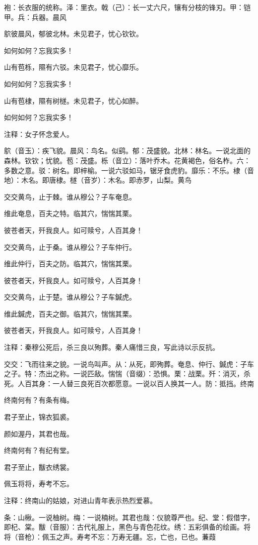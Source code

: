 \documentclass[12pt,UTF8]{ctexbook}
\begin{document}
袍：长衣服的统称。泽：里衣。戟（己）：长一丈六尺，镶有分枝的锋刃。甲：铠甲。兵：兵器。晨风

鴥彼晨风，郁彼北林。未见君子，忧心钦钦。

如何如何？忘我实多！

山有苞栎，隰有六驳。未见君子，忧心靡乐。

如何如何？忘我实多！

山有苞棣，隰有树檖。未见君子，忧心如醉。

如何如何？忘我实多！

注释：女子怀念爱人。

鴥（音玉）：疾飞貌。晨风：鸟名。似鹞。郁：茂盛貌。北林：林名。一说北面的森林。钦钦；忧貌。苞：茂盛。栎（音立）：落叶乔木。花黄褐色，俗名柞。六：多数之意。驳：树名。即梓榆。一说六驳如马，锯牙食虎豹。靡乐：不乐。棣（音地）：木名。即唐棣。檖（音岁）：木名。即赤罗，山梨。黄鸟

交交黄鸟，止于棘。谁从穆公？子车奄息。

维此奄息，百夫之特。临其穴，惴惴其栗。

彼苍者天，歼我良人。如可赎兮，人百其身！

交交黄鸟，止于桑。谁从穆公？子车仲行。

维此仲行，百夫之防。临其穴，惴惴其栗。

彼苍者天，歼我良人。如可赎兮，人百其身！

交交黄鸟，止于楚。谁从穆公？子车鍼虎。

维此鍼虎，百夫之御。临其穴，惴惴其栗。

彼苍者天，歼我良人。如可赎兮，人百其身！

注释：秦穆公死后，杀三良以殉葬。秦人痛惜三良，写此诗以示反抗。

交交：飞而往来之貌。一说鸟叫声。从：从死，即殉葬。奄息、仲行、鍼虎：子车之子。特：杰出之称。一说匹敌。惴惴（音缀）：恐惧。栗：战栗。歼：消灭，杀死。人百其身：一人替三良死百次都愿意。一说以百人换其一人。防：抵挡。终南

终南何有？有条有梅。

君子至止，锦衣狐裘。

颜如渥丹，其君也哉。

终南何有？有纪有堂。

君子至止，黻衣绣裳。

佩玉将将，寿考不忘。

注释：终南山的姑娘，对进山青年表示热烈爱慕。

条：山楸。一说柚树。梅：一说楠树。其君也哉：仪貌尊严也。纪、堂：假借字，即杞、棠。黻（音服）：古代礼服上，黑色与青色花纹。绣：五彩俱备的绘画。将将（音枪）：佩玉之声。寿考不忘：万寿无疆。忘，亡也，已也。蒹葭
\end{document}
